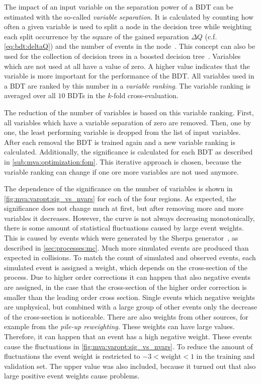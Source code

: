 The impact of an input variable on the separation power of a BDT can be estimated with the so-called \emph{variable separation}.
It is calculated by counting how often a given variable is used to split a node in the decision tree while
weighting each split occurrence by the square of the gained separation $\Delta Q$ (c.f. \cref{eq:bdt:deltaQ})
and the number of events in the node~\cite{Breiman1984}.
This concept can also be used for the collection of decision trees in a boosted decision tree~\cite{TMVA}.
Variables which are not used at all have a value of zero.
A higher value indicates that the variable is more important for the performance of the BDT\@.
All variables used in a BDT are ranked by this number in a \emph{variable ranking}.
The variable ranking is averaged over all $10$ BDTs in the $k$-fold cross-evaluation.

The reduction of the number of variables is based on this variable ranking.
First, all variables which have a variable separation of zero are removed.
Then, one by one, the least performing variable is dropped from the list of input variables.
After each removal the BDT is trained again and a new variable ranking is calculated.
Additionally, the significance is calculated for each BDT as described in \cref{sub:mva:optimization:fom}.
This iterative approach is chosen, because the variable ranking can change if one ore more variables are not used anymore.

The dependence of the significance on the number of variables is shown in \cref{fig:mva:varopt:sig_vs_nvars} for each of the four regions.
As expected, the significance does not change much at first, but after removing more and more variables it decreases.
However, the curve is not always decreasing monotonically, there is some amount of statistical fluctuations caused by large event weights.
This is caused by events which were generated by the Sherpa generator~\cite{Sherpa,Gleisberg:2008fv,Cascioli:2011va,Schumann:2007mg,Hoeche:2012yf},
as described in \cref{sec:processes:mc}.
Much more simulated events are produced than expected in collisions.
To match the count of simulated and observed events, each simulated event is assigned a weight, which depends on the cross-section of the process.
Due to higher order corrections it can happen that also negative events are assigned, in the case that the cross-section of the higher order
correction is smaller than the leading order cross section. Single events which negative weights are unphysical, but combined
with a large group of other events only the decrease of the cross-section is noticeable.
There are also weights from other sources, for example from the \emph{pile-up reweighting}. These weights can have large values.
Therefore, it can happen that an event has a high negative weight.
These events cause the fluctuations in \cref{fig:mva:varopt:sig_vs_nvars}.
To reduce the amount of fluctuations the event weight is restricted to $-3 < \text{weight} < 1$ in the training and validation set.
The upper value was also included, because it turned out that also large positive event weights cause problems.

